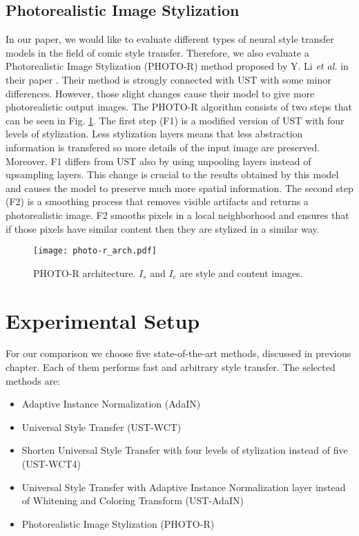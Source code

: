 \documentclass{llncs}
\begin{document}
\subsection{Photorealistic Image Stylization}
In our paper, we would like to evaluate different types of neural style transfer models in the field of comic style transfer. Therefore, we also evaluate a Photorealistic Image Stylization (PHOTO-R) method proposed by Y. Li \textit{et al.} in their paper \cite{photo:real}. Their method is strongly connected with UST with some minor differences. However, those slight changes cause their model to give more photorealistic output images. The PHOTO-R algorithm consists of two steps that can be seen in Fig. \ref{photo-r-arch}. The first step (F1) is a modified version of UST with four levels of stylization. Less stylization layers means that less abstraction information is transfered so more details of the input image are preserved. Moreover, F1 differs from UST also by using unpooling layers instead of upsampling layers. This change is crucial to the results obtained by this model and causes the model to preserve much more spatial information. The second step (F2) is a smoothing process that removes visible artifacts and returns a photorealistic image. F2 smooths pixels in a local neighborhood and ensures that if those pixels have similar content then they are stylized in a similar way. %

\begin{figure}[H]
  \centering
  \texttt{[image: photo-r\_arch.pdf]}
  \caption{PHOTO-R architecture. $I_s$ and $I_c$ are style and content images. \label{photo-r-arch}}
\end{figure}

\section{Experimental Setup}
For our comparison we choose five state-of-the-art methods, discussed in previous chapter. Each of them performs fast and arbitrary style transfer. The selected methods are:
\begin{itemize}
\item Adaptive Instance Normalization (AdaIN) \cite{huang:belongie}
\item Universal Style Transfer (UST-WCT) \cite{universal:style}
\item Shorten Universal Style Transfer with four levels of stylization instead of five (UST-WCT4)
\item Universal Style Transfer with Adaptive Instance Normalization layer \cite{huang:belongie} instead of Whitening and Coloring Transform \cite{universal:style} (UST-AdaIN)
\item Photorealistic Image Stylization (PHOTO-R) \cite{photo:real}
\end{itemize}
\end{document}
